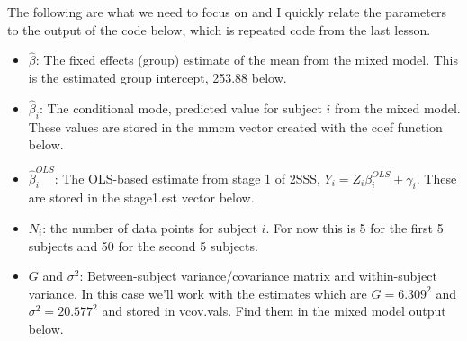 \documentclass[
]{book}
\newenvironment{Shaded}{\begin{snugshade}}{\end{snugshade}}
\newcommand{\CommentTok}[1]{\textcolor[rgb]{0.56,0.35,0.01}{\textit{#1}}}
\newcommand{\ControlFlowTok}[1]{\textcolor[rgb]{0.13,0.29,0.53}{\textbf{#1}}}
\newcommand{\DecValTok}[1]{\textcolor[rgb]{0.00,0.00,0.81}{#1}}
\newcommand{\KeywordTok}[1]{\textcolor[rgb]{0.13,0.29,0.53}{\textbf{#1}}}
\newcommand{\NormalTok}[1]{#1}
\newcommand{\OperatorTok}[1]{\textcolor[rgb]{0.81,0.36,0.00}{\textbf{#1}}}
\newcommand{\OtherTok}[1]{\textcolor[rgb]{0.56,0.35,0.01}{#1}}
\newcommand{\StringTok}[1]{\textcolor[rgb]{0.31,0.60,0.02}{#1}}
\providecommand{\tightlist}{%
  \setlength{\itemsep}{0pt}\setlength{\parskip}{0pt}}
\begin{document}
The following are what we need to focus on and I quickly relate the parameters to the output of the code below, which is repeated code from the last lesson.

\begin{itemize}
\tightlist
\item
  \(\hat\beta\): The fixed effects (group) estimate of the mean from the mixed model. This is the estimated group intercept, 253.88 below.
\item
  \(\hat\beta_i\): The conditional mode, predicted value for subject \(i\) from the mixed model. These values are stored in the mmcm vector created with the coef function below.
\item
  \(\hat\beta_i^{OLS}\): The OLS-based estimate from stage 1 of 2SSS, \(Y_i = Z_i\beta_i^{OLS} + \gamma_i.\) These are stored in the stage1.est vector below.
\item
  \(N_i\): the number of data points for subject \(i\). For now this is 5 for the first 5 subjects and 50 for the second 5 subjects.
\item
  \(G\) and \(\sigma^2\): Between-subject variance/covariance matrix and within-subject variance. In this case we'll work with the estimates which are \(G=6.309^2\) and \(\sigma^2 = 20.577^2\) and stored in vcov.vals. Find them in the mixed model output below.
\end{itemize}

\begin{Shaded}
\end{Shaded}
\end{document}
